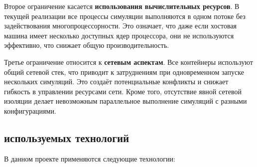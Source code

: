 Второе ограничение касается \textbf{использования вычислительных ресурсов}. В текущей реализации все процессы симуляции выполняются в одном потоке без задействования многопроцессорности. Это означает, что даже если хостовая машина имеет несколько доступных ядер процессора, они не используются эффективно, что снижает общую производительность.

Третье ограничение относится к \textbf{сетевым аспектам}. Все контейнеры используют общий сетевой стек, что приводит к затруднениям при одновременном запуске нескольких симуляций. Это создаёт потенциальные конфликты и снижает гибкость в управлении ресурсами сети. Кроме того, отсутствие явной сетевой изоляции делает невозможным параллельное выполнение симуляций с разными конфигурациями.

\subsection{используемых технологий}

В данном проекте применяются следующие технологии:

